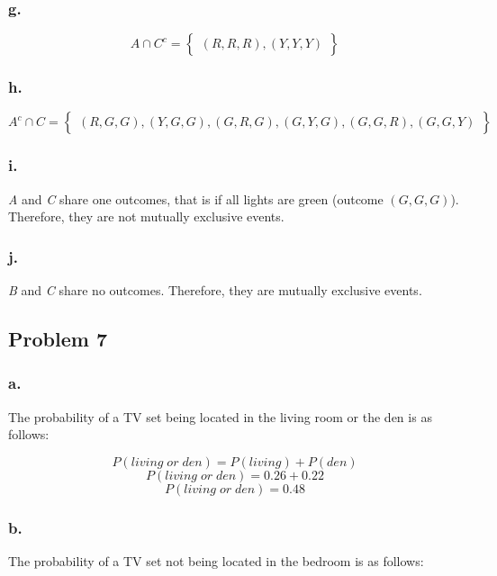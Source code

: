 \documentclass[11pt]{article}
\begin{document}
\subsubsection*{g.}

\[ A \cap C^c = \left\{ 
    \begin{array}{c}
        \left( R, R, R \right),
        \left( Y, Y, Y \right)
    \end{array}
\right\} \]

\subsubsection*{h.}
\[ A^c \cap C = \left\{ 
    \begin{array}{c}
        \left( R, G, G \right),
        \left( Y, G, G \right), 
        \left( G, R, G \right),
        \left( G, Y, G \right),
        \left( G, G, R \right),
        \left( G, G, Y \right)
    \end{array}
\right\} \]

\subsubsection*{i.}
\textit{A} and \textit{C} share one outcomes, that is if all lights are green
(outcome $(G, G, G)$). Therefore, they are not mutually exclusive events. 

\subsubsection*{j.}
\textit{B} and \textit{C} share no outcomes. Therefore, they are mutually
exclusive events. 

\subsection*{Problem 7}
\subsubsection*{a.}
The probability of a TV set being located in the living room or the den is as
follows:

\[ P(living\;or\;den) = P(living) + P(den) \]
\[ P(living\;or\;den) = 0.26 + 0.22 \]
\[ P(living\;or\;den) = 0.48 \]

\subsubsection*{b.}
The probability of a TV set not being located in the bedroom is as follows:
\end{document}
